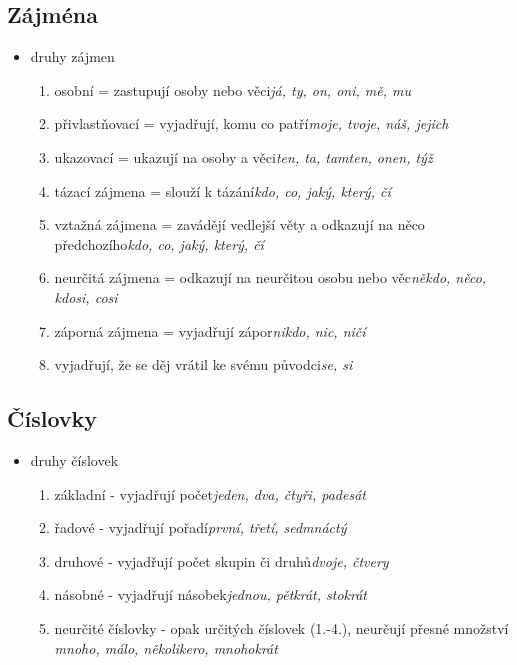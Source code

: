 \documentclass{memoir}
\begin{document}
	\subsection*{Zájména}
	\begin{itemize}
		\item druhy zájmen
		\begin{enumerate}
			\item osobní = zastupují osoby nebo věci\hfill\textit{já, ty, on, oni, mě, mu}
			\item přivlastňovací = vyjadřují, komu co patří\hfill\textit{moje, tvoje, náš, jejich}
			\item ukazovací = ukazují na osoby a věci\hfill\textit{ten, ta, tamten, onen, týž}
			\item tázací zájmena = slouží k tázání\hfill\textit{kdo, co, jaký, který, čí}
			\item vztažná zájmena = zavádějí vedlejší věty a odkazují na něco předchozího\hfill\textit{kdo, co, jaký, který, čí}
			\item neurčitá zájmena = odkazují na neurčitou osobu nebo věc\hfill\textit{někdo, něco, kdosi, cosi}
			\item záporná zájmena = vyjadřují zápor\hfill\textit{nikdo, nic, ničí}
			\item vyjadřují, že se děj vrátil ke svému původci\hfill\textit{se, si}
		\end{enumerate}
	\end{itemize}
	\subsection*{Číslovky}
	\begin{itemize}
		\item druhy číslovek
		\begin{enumerate}
			\item základní - vyjadřují počet\hfill\textit{jeden, dva, čtyři, padesát}
			\item řadové - vyjadřují pořadí\hfill\textit{první, třetí, sedmnáctý}
			\item druhové - vyjadřují počet skupin či druhů\hfill\textit{dvoje, čtvery}
			\item násobné - vyjadřují násobek\hfill\textit{jednou, pětkrát, stokrát}
			\item neurčité číslovky - opak určitých číslovek (1.-4.), neurčují přesné množství \hfill\textit{mnoho, málo, několikero, mnohokrát}
		\end{enumerate}
	\end{itemize}
\end{document}
